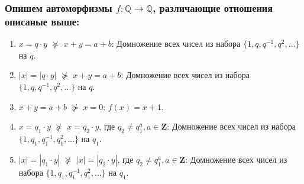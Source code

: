 \documentclass[12pt]{article}
\theoremstyle{definition}
\begin{document}
	\subsubsection{Опишем автоморфизмы $f \colon \mathbb{Q} \longrightarrow \mathbb{Q}$, различающие отношения описаные выше:}
	\begin{enumerate}
	    
	    \item $x =q\cdot y$ $\nsucceq$ $x + y = a + b$: Домножение всех чисел из набора $\{1, q, q^{-1}, q^2, \dots \}$ на $q$.
	    
	    \item $|x| =|q\cdot y|$ $\nsucceq$ $x + y = a + b$: Домножение всех чисел из набора $\{1, q, q^{-1}, q^2, \dots \}$ на $q$.
	    
	    \item $x+y = a+b$ $\nsucceq$ $x = 0$: $f(x) = x+1$.
	    
	    \item $x =q_1\cdot y$ $\nsucceq$ $x =q_2\cdot y$, где $q_2 \neq q_1^{a}, a \in \textbf{Z}$: Домножение всех чисел из набора $\{1, q_1, q_1^{-1}, q_1^2, \dots \}$ на $q_1$.
	    
	    \item $|x| =|q_1\cdot y|$ $\nsucceq$ $|x| =|q_2\cdot y|$, где $q_2 \neq q_1^{a}, a \in \textbf{Z}$: Домножение всех чисел из набора $\{1, q_1, q_1^{-1}, q_1^2, \dots \}$ на $q_1$.
	    
	\end{enumerate}
	
	    
	
	
	
	
\end{document}
